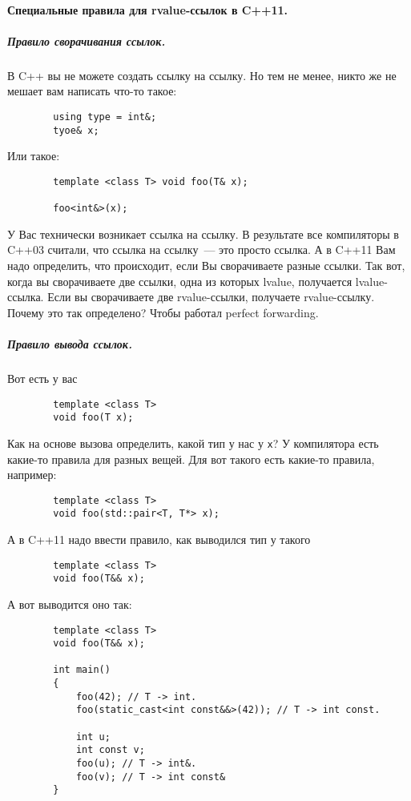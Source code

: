 \documentclass{article}
\begin{document}
    \paragraph{Специальные правила для rvalue-ссылок в C++11.}
    \subparagraph{Правило сворачивания ссылок.}
    В C++ вы не можете создать ссылку на ссылку. Но тем не менее, никто же не мешает вам написать что-то такое:
    \begin{verbatim}
        using type = int&;
        tyoe& x;
    \end{verbatim}
    Или такое:
    \begin{verbatim}
        template <class T> void foo(T& x);

        foo<int&>(x);
    \end{verbatim}
    У Вас технически возникает ссылка на ссылку. В результате все компиляторы в C++03 считали, что ссылка на ссылку~--- это просто ссылка. А в C++11 Вам надо определить, что происходит, если Вы сворачиваете разные ссылки. Так вот, когда вы сворачиваете две ссылки, одна из которых lvalue, получается lvalue-ссылка. Если вы сворачиваете две rvalue-ссылки, получаете rvalue-ссылку. Почему это так определено? Чтобы работал perfect forwarding.
    \subparagraph{Правило вывода ссылок.}
    Вот есть у вас
    \begin{verbatim}
        template <class T>
        void foo(T x);
    \end{verbatim}
    Как на основе вызова определить, какой тип у нас у \texttt{x}? У компилятора есть какие-то правила для разных вещей. Для вот такого есть какие-то правила, например:
    \begin{verbatim}
        template <class T>
        void foo(std::pair<T, T*> x);
    \end{verbatim}
    А в C++11 надо ввести правило, как выводился тип у такого
    \begin{verbatim}
        template <class T>
        void foo(T&& x);
    \end{verbatim}
    А вот выводится оно так:
    \begin{verbatim}
        template <class T>
        void foo(T&& x);
        
        int main()
        {
            foo(42); // T -> int.
            foo(static_cast<int const&&>(42)); // T -> int const.
            
            int u;
            int const v;
            foo(u); // T -> int&.
            foo(v); // T -> int const&
        }
    \end{verbatim}
\end{document}
